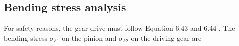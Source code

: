 



%
%
%
%
%

%
\subsection{Bending stress analysis}
For safety reasons, the gear drive must follow Equation 6.43 and 6.44 \cite{tk1}. The bending stress $ \sigma_{F1} $ on the pinion and $ \sigma_{F2} $ on the driving gear are

